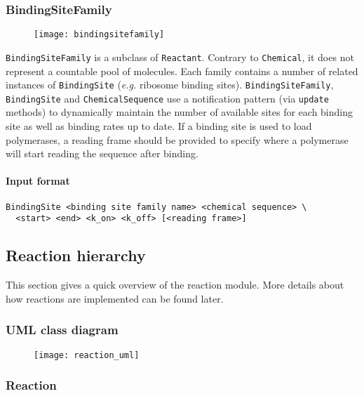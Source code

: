 \subsubsection{BindingSiteFamily}

\begin{figure}[!ht]
	\centering
	\texttt{[image: bindingsitefamily]}
\end{figure}

\texttt{BindingSiteFamily} is a subclass of \texttt{Reactant}. Contrary to \texttt{Chemical}, it does not represent a countable pool of molecules. Each family contains a number of related instances of \texttt{BindingSite} (\textit{e.g.} ribosome binding sites). \texttt{BindingSiteFamily}, \texttt{BindingSite} and \texttt{ChemicalSequence} use a notification pattern (via \texttt{update} methods) to dynamically maintain the number of available sites for each binding site as well as binding rates up to date. If a binding site is used to load polymerases, a reading frame should be provided to specify where a polymerase will start reading the sequence after binding.

\paragraph{Input format}
\begin{verbatim}
BindingSite <binding site family name> <chemical sequence> \
  <start> <end> <k_on> <k_off> [<reading frame>]
\end{verbatim}



\subsection{Reaction hierarchy}

This section gives a quick overview of the reaction module. More details about how reactions are implemented can be found later.

\subsubsection{UML class diagram}

\begin{figure}[!ht]
	\centering
	\texttt{[image: reaction\_uml]}
\end{figure}

\subsubsection{Reaction}

